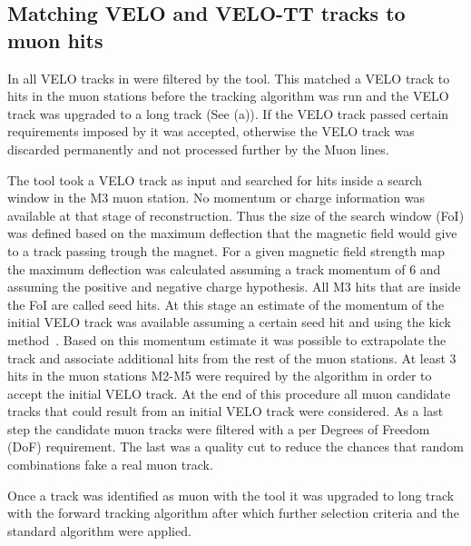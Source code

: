 \subsection{Matching VELO and VELO-TT tracks to muon hits}
\label{sec:muon_matching}

In \runone all VELO tracks in \hltone were filtered by the \mvm tool. This matched a VELO track to hits in the muon 
stations before the \FwD tracking algorithm was run and the VELO track was upgraded to a long track (See (a)). 
If the VELO track passed certain requirements imposed by \mvm it was accepted, otherwise the VELO track was discarded
permanently and not processed further by the \hltone Muon lines. 

The \mvm tool took a VELO track as input and searched for hits inside a search window in the M3 muon station. 
No momentum or charge information was available at that stage of reconstruction. Thus the size of the search window (FoI) 
was defined based on the maximum deflection that the magnetic field would give to a track passing trough the
\lhcb magnet. For a given magnetic field strength map the maximum deflection was calculated assuming 
a track momentum of 6 \gevc and assuming the positive and negative charge hypothesis. 
All M3 hits that are inside the FoI are called seed hits. 
At this stage an estimate of the momentum of the initial VELO track was available assuming a certain seed hit 
and using the kick method~\cite{CERN-THESIS-2015-102}. Based on this momentum estimate it was possible 
to extrapolate the track and associate additional hits from the rest of the muon stations. 
At least 3 hits in the muon stations M2-M5 were required by the algorithm in order to accept the initial VELO track.
At the end of this procedure all muon candidate tracks that could result from an initial VELO track were considered. 
As a last step the candidate muon tracks were filtered with a \chisq per Degrees of Freedom (DoF) requirement. 
The last was a quality cut to reduce the chances that random combinations fake a real muon track.

Once a track was identified as muon with the \mvm tool it was upgraded to long track with 
the forward tracking algorithm after which further selection criteria and the standard  algorithm were applied.  


